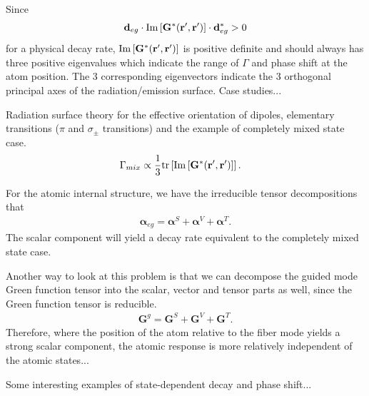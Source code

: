 \documentclass[preprint,aps,pra,onecolumn]{revtex4-1} %
\begin{document}
Since 
\begin{align}
\mathbf{d}_{eg}\cdot \mathrm{Im}\left[\mathbf{G}^*(\mathbf{r}',\mathbf{r}') \right]\cdot\mathbf{d}_{eg}^*>0
\end{align}
for a physical decay rate, $\mathrm{Im}\left[\mathbf{G}^*(\mathbf{r}',\mathbf{r}')\right]$ is positive definite and should always has three positive eigenvalues which indicate the range of $ \Gamma $ and phase shift at the atom position. The 3 corresponding eigenvectors indicate the 3 orthogonal principal axes of the radiation/emission surface. Case studies...

Radiation surface theory for the effective orientation of dipoles, elementary transitions ($ \pi $ and $ \sigma_\pm $ transitions) and the example of completely mixed state case. 
\begin{align}
\Gamma_{mix} &\propto \frac{1}{3} \mathrm{tr}\left[ \mathrm{Im}\left[\mathbf{G}^*(\mathbf{r}',\mathbf{r}')\right] \right].
\end{align}

For the atomic internal structure, we have the irreducible tensor decompositions that 
\begin{align}
\boldsymbol{\alpha}_{eg} = \boldsymbol{\alpha}^S + \boldsymbol{\alpha}^V + \boldsymbol{\alpha}^T.
\end{align}
The scalar component will yield a decay rate equivalent to the completely mixed state case. 

Another way to look at this problem is that we can decompose the guided mode Green function tensor into the scalar, vector and tensor parts as well, since the Green function tensor is reducible.
\begin{align}
\mathbf{G}^g=\mathbf{G}^S+\mathbf{G}^V+\mathbf{G}^T.
\end{align}
Therefore, where the position of the atom relative to the fiber mode yields a strong scalar component, the atomic response is more relatively independent of the atomic states... 

Some interesting examples of state-dependent decay and phase shift...



%
%


%	
%	
\end{document}
